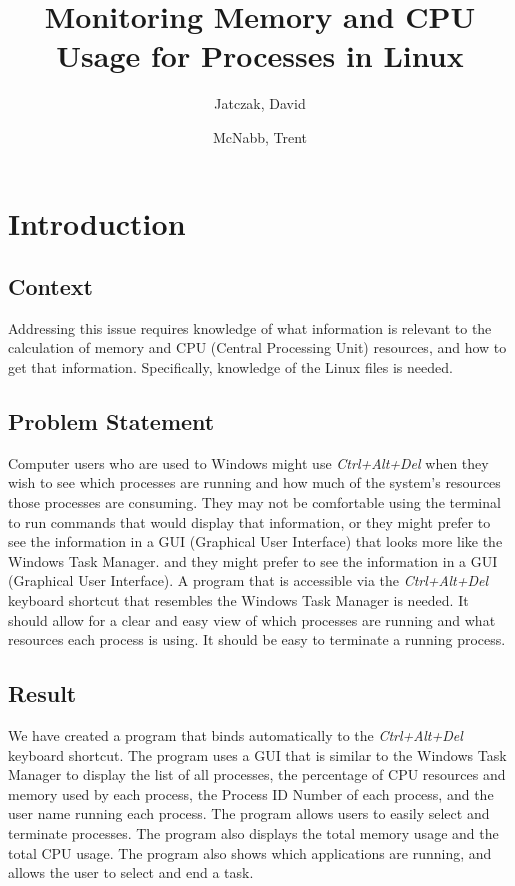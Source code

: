 \documentclass[12pt]{article}
\title{Monitoring Memory and CPU Usage for Processes in Linux}
\author{Jatczak, David \and McNabb, Trent}
\begin{document}
	
	\maketitle
	
	\section{Introduction}
	
	\subsection{Context}
	Addressing this issue requires knowledge of what information is relevant to the calculation of memory and CPU (Central Processing Unit) resources, and how to get that information. Specifically, knowledge of the Linux  files is needed.
	
	\subsection{Problem Statement}
	Computer users who are used to Windows might use \emph{Ctrl+Alt+Del} when they wish to see which processes are running and how much of the system's resources those processes are consuming. They may not be comfortable using the terminal to run commands that would display that information, or they might prefer to see the information in a GUI (Graphical User Interface) that looks more like the Windows Task Manager. and they might prefer to see the information in a GUI (Graphical User Interface). A program that is accessible via the \emph{Ctrl+Alt+Del} keyboard shortcut that resembles the Windows Task Manager is needed. It should allow for a clear and easy view of which processes are running and what resources each process is using. It should be easy to terminate a running process.
	
	\subsection{Result}
We have created a program that binds automatically to the \emph{Ctrl+Alt+Del} keyboard shortcut. The program uses a GUI that is similar to the Windows Task Manager to display the list of all processes, the percentage of CPU resources and memory used by each process, the Process ID Number of each process, and the user name running each process. The program allows users to easily select and terminate processes. The program also displays the total memory usage and the total CPU usage. The program also shows which applications are running, and allows the user to select and end a task.
	
\end{document}
